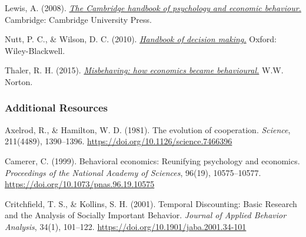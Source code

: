 \documentclass[
  x11names]{article}
\begin{document}
Lewis, A. (2008).
\href{https://uol.primo.exlibrisgroup.com/discovery/fulldisplay?docid=alma991003792192903496&context=L&vid=353UOL_INST:353UOL_VU1&lang=en&search_scope=MyInst_and_CI&adaptor=Local\%20Search\%20Engine&tab=TAB1&query=any,contains,The\%20Cambridge\%20handbook\%20of\%20psychology\%20and\%20economic\%20behaviour.&sortby=rank&offset=0}{\color{blue}\emph{The
Cambridge handbook of psychology and economic behaviour.}\color{black}}
Cambridge: Cambridge University Press.

Nutt, P. C., \& Wilson, D. C. (2010).
\href{https://uol.primo.exlibrisgroup.com/discovery/fulldisplay?docid=alma991001512319703496&context=L&vid=353UOL_INST:353UOL_VU1&lang=en&search_scope=MyInst_and_CI&adaptor=Local\%20Search\%20Engine&tab=TAB1&query=any,contains,Handbook\%20of\%20decision\%20making.&sortby=rank&offset=0}{\color{blue}\emph{Handbook
of decision making.}\color{black}} Oxford: Wiley-Blackwell.

Thaler, R. H. (2015).
\href{https://uol.primo.exlibrisgroup.com/discovery/fulldisplay?docid=alma991003236569703496&context=L&vid=353UOL_INST:353UOL_VU1&lang=en&search_scope=MyInst_and_CI&adaptor=Local\%20Search\%20Engine&tab=TAB1&query=any,contains,Misbehaving:\%20The\%20Making\%20of\%20Behavioral\%20Economics.&sortby=rank&offset=0}{\color{blue}\emph{Misbehaving:
how economics became behavioural.}\color{black}} W.W. Norton.

\setlength{\leftskip}{0in}

\subsubsection{Additional Resources}\label{additional-resources}

\noindent \vspace{-2em} \setlength{\parindent}{-0.5in}
\setlength{\leftskip}{0.5in} \setlength{\parskip}{7.5pt}

Axelrod, R., \& Hamilton, W. D. (1981). The evolution of cooperation.
\emph{Science}, 211(4489), 1390--1396. \color{blue}
\url{https://doi.org/10.1126/science.7466396} \color{black}

Camerer, C. (1999). Behavioral economics: Reunifying psychology and
economics. \emph{Proceedings of the National Academy of Sciences},
96(19), 10575--10577. \color{blue}
\url{https://doi.org/10.1073/pnas.96.19.10575} \color{black}

Critchfield, T. S., \& Kollins, S. H. (2001). Temporal Discounting:
Basic Research and the Analysis of Socially Important Behavior.
\emph{Journal of Applied Behavior Analysis}, 34(1), 101--122.
\color{blue} \url{https://doi.org/10.1901/jaba.2001.34-101}
\color{black}
\end{document}
